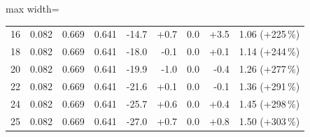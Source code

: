 \begin{table}[htbp]
\begin{adjustbox}{max width=\textwidth}
\begin{tabular}{r rrr rrrr r}
        16 & 0.082 & 0.669 & 0.641 & -14.7 & +0.7 & 0.0 & +3.5 & 1.06 (+225\,\%) \\
        18 & 0.082 & 0.669 & 0.641 & -18.0 & -0.1 & 0.0 & +0.1 & 1.14 (+244\,\%) \\
        20 & 0.082 & 0.669 & 0.641 & -19.9 & -1.0 & 0.0 & -0.4 & 1.26 (+277\,\%) \\
        22 & 0.082 & 0.669 & 0.641 & -21.6 & +0.1 & 0.0 & -0.1 & 1.36 (+291\,\%) \\
        24 & 0.082 & 0.669 & 0.641 & -25.7 & +0.6 & 0.0 & +0.4 & 1.45 (+298\,\%) \\
        25 & 0.082 & 0.669 & 0.641 & -27.0 & +0.7 & 0.0 & +0.8 & 1.50 (+303\,\%) \\
        \bottomrule
    \end{tabular}
    \end{adjustbox}
\end{table}
